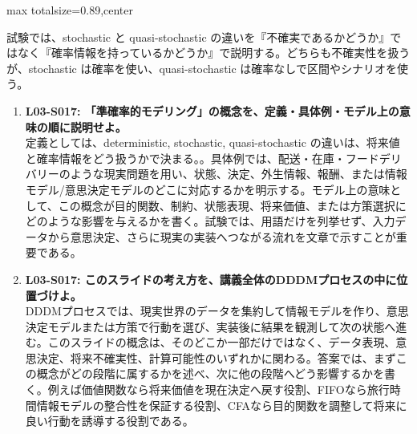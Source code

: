 \begin{minipage}[t]{0.58\textwidth}
\begin{adjustbox}{max totalsize={\textwidth}{0.89\textheight},center}
\begin{minipage}{\textwidth}
試験では、stochastic と quasi-stochastic の違いを『不確実であるかどうか』ではなく『確率情報を持っているかどうか』で説明する。どちらも不確実性を扱うが、stochastic は確率を使い、quasi-stochastic は確率なしで区間やシナリオを使う。\par{}\begin{enumerate}\item \textbf{L03-S017: 「準確率的モデリング」の概念を、定義・具体例・モデル上の意味の順に説明せよ。}\\定義としては、deterministic, stochastic, quasi-stochastic の違いは、将来値と確率情報をどう扱うかで決まる。。具体例では、配送・在庫・フードデリバリーのような現実問題を用い、状態、決定、外生情報、報酬、または情報モデル/意思決定モデルのどこに対応するかを明示する。モデル上の意味として、この概念が目的関数、制約、状態表現、将来価値、または方策選択にどのような影響を与えるかを書く。試験では、用語だけを列挙せず、入力データから意思決定、さらに現実の実装へつながる流れを文章で示すことが重要である。\item \textbf{L03-S017: このスライドの考え方を、講義全体のDDDMプロセスの中に位置づけよ。}\\DDDMプロセスでは、現実世界のデータを集約して情報モデルを作り、意思決定モデルまたは方策で行動を選び、実装後に結果を観測して次の状態へ進む。このスライドの概念は、そのどこか一部だけではなく、データ表現、意思決定、将来不確実性、計算可能性のいずれかに関わる。答案では、まずこの概念がどの段階に属するかを述べ、次に他の段階へどう影響するかを書く。例えば価値関数なら将来価値を現在決定へ戻す役割、FIFOなら旅行時間情報モデルの整合性を保証する役割、CFAなら目的関数を調整して将来に良い行動を誘導する役割である。\end{enumerate}
\end{minipage}
\end{adjustbox}
\end{minipage}


